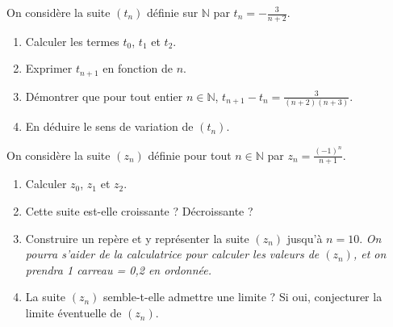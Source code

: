 \documentclass[11pt]{article}
\begin{document}
\begin{exo}[$3$ points]
  On considère la suite $(t_n)$ définie sur $\mathbb{N}$ par
  $t_n=-\frac{3}{n+2}$.
  \begin{enumerate}
    \item Calculer les termes $t_0$, $t_1$ et $t_2$.
    \item Exprimer $t_{n+1}$ en fonction de $n$.
    \item Démontrer que pour tout entier $n\in\mathbb{N}$,
      $t_{n+1}-t_n=\frac{3}{(n+2)(n+3)}$.
    \item En déduire le sens de variation de $(t_n)$.
  \end{enumerate}
\end{exo}

\begin{exo}[$2$ points]
  On considère la suite $(z_n)$ définie pour tout $n\in\mathbb{N}$ par
  $z_n=\frac{(-1)^n}{n+1}$.
  \begin{enumerate}
    \item Calculer $z_0$, $z_1$ et $z_2$.
    \item Cette suite est-elle croissante ? Décroissante ?
    \item Construire un repère et y représenter la suite $(z_n)$ jusqu'à $n=10$.
      \emph{On pourra s'aider de la calculatrice pour calculer les valeurs de
      $(z_n)$, et on prendra 1 carreau = 0,2 en ordonnée.}
    \item La suite $(z_n)$ semble-t-elle admettre une limite ? Si oui,
      conjecturer la limite éventuelle de $(z_n)$.
  \end{enumerate}
\end{exo}
\end{document}
